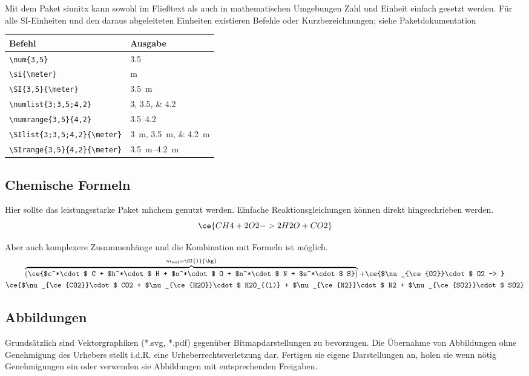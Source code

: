 Mit dem Paket siunitx kann sowohl im Fließtext als auch in mathematischen Umgebungen Zahl und Einheit einfach gesetzt werden. Für alle SI-Einheiten und den daraus abgeleiteten Einheiten existieren Befehle oder Kurzbezeichnungen; siehe Paketdokumentation
\begin{center}
	\begin{tabular}{ll}
		Befehl &	Ausgabe\\
		\midrule
		\lstinline|\num{3,5}| &\num{3,5} \\
		\lstinline|\si{\meter}| &\si{\meter}  \\
		\lstinline|\SI{3,5}{\meter}| &\SI{3,5}{\meter}  \\
		\lstinline|\numlist{3;3,5;4,2}| &	\numlist{3;3,5;4,2}  \\
		\lstinline|\numrange{3,5}{4,2}| &\numrange{3,5}{4,2}  \\
		\lstinline|\SIlist{3;3,5;4,2}{\meter}| &\SIlist{3;3,5;4,2}{\meter}  \\
		\lstinline|\SIrange{3,5}{4,2}{\meter}|&\SIrange{3,5}{4,2}{\meter}\\
	\end{tabular}
\end{center}
  

\subsection{Chemische Formeln}
\label{sec:latex-chem-formeln}

Hier sollte das leistungsstarke Paket mhchem genutzt werden. Einfache Reaktionsgleichungen können direkt hingeschrieben werden.
\begin{equation}
\ce{CH4 + 2O2 -> 2H2O + CO2}
\end{equation}

Aber auch komplexere Zusammenhänge und die Kombination mit Formeln ist möglich.
\begin{multline}
\label{eq:kohle_reaktion}
\overbrace{\left(\ce{$c^*\cdot$ C + $h^*\cdot$ H + $o^*\cdot$ O + $n^*\cdot$ N + $s^*\cdot$ S}\right)}^{m_{\text{waf}}=\SI{1}{\kg}} +
\ce{$\nu_{\ce{O2}}\cdot$ O2 -> }\\
\ce{$\nu_{\ce{CO2}}\cdot$ CO2 + $\nu_{\ce{H2O}}\cdot$ H2O_{(l)} + $\nu_{\ce{N2}}\cdot$ N2 + $\nu_{\ce{SO2}}\cdot$ SO2}
\end{multline}


\subsection{Abbildungen}
\label{sec:latex-abbildungen}
Grundsätzlich sind Vektorgraphiken (*.svg, *.pdf) gegenüber Bitmapdarstellungen zu bevorzugen. Die Übernahme von Abbildungen ohne Genehmigung des Urhebers stellt i.d.R. eine Urheberrechtsverletzung dar. Fertigen sie eigene Darstellungen an, holen sie wenn nötig Genehmigungen ein oder verwenden sie Abbildungen mit entsprechenden Freigaben.


